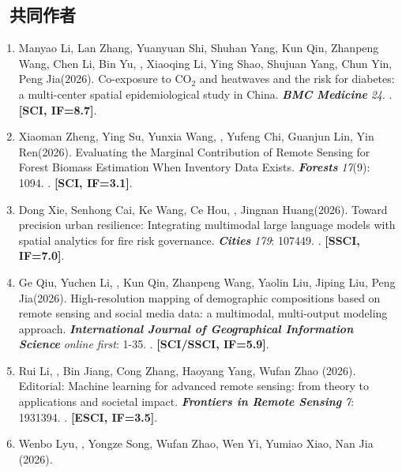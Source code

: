 \subsection*{\texorpdfstring{\faBook\ 共同作者}{共同作者}}
\begin{enumerate}
\item
    Manyao Li, Lan Zhang, Yuanyuan Shi\CS, Shuhan Yang, Kun Qin, Zhanpeng Wang, Chen Li, Bin Yu, \Shaoqing, Xiaoqing Li, Ying Shao, Shujuan Yang, Chun Yin, Peng Jia\CS (2026).
    Co-exposure to CO$_2$ and heatwaves and the risk for diabetes: a multi-center spatial epidemiological study in China.
    \textbf{\textit{BMC Medicine}} \textit{24}.
    . \textbf{[SCI, IF=8.7]}.
\item
    Xiaoman Zheng, Ying Su, Yunxia Wang, \Shaoqing, Yufeng Chi, Guanjun Lin, Yin Ren\CS (2026).
    Evaluating the Marginal Contribution of Remote Sensing for Forest Biomass Estimation When Inventory Data Exists.
    \textbf{\textit{Forests}} \textit{17}(9): 1094.
    . \textbf{[SCI, IF=3.1]}.
\item
    Dong Xie, Senhong Cai, Ke Wang, Ce Hou, \Shaoqing, Jingnan Huang\CS (2026).
    Toward precision urban resilience: Integrating multimodal large language models with spatial analytics for fire risk governance.
    \textbf{\textit{Cities}} \textit{179}: 107449.
    . \textbf{[SSCI, IF=7.0]}.
\item
    Ge Qiu, Yuchen Li, \Shaoqing, Kun Qin, Zhanpeng Wang, Yaolin Liu, Jiping Liu\CS, Peng Jia\CS (2026).
    High-resolution mapping of demographic compositions based on remote sensing and social media data: a multimodal, multi-output modeling approach.
    \textbf{\textit{International Journal of Geographical Information Science}} \textit{online first}: 1-35.
    . \textbf{[SCI/SSCI, IF=5.9]}.
\item
    Rui Li\CS, \Shaoqing, Bin Jiang, Cong Zhang, Haoyang Yang, Wufan Zhao (2026).
    Editorial: Machine learning for advanced remote sensing: from theory to applications and societal impact.
    \textbf{\textit{Frontiers in Remote Sensing}} \textit{7}: 1931394.
    . \textbf{[ESCI, IF=3.5]}.
\item
    Wenbo Lyu, \Shaoqing, Yongze Song\CS, Wufan Zhao, Wen Yi, Yumiao Xiao, Nan Jia (2026).

\end{enumerate}

